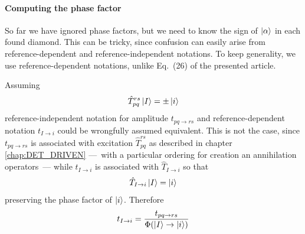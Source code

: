 \documentclass[./thesis.tex]{subfiles}
\begin{document}
\paragraph{Computing the phase factor}



So far we have ignored phase factors, but we need to know the sign of ${\ket{\alpha}}$ in each found diamond. This can be tricky, since confusion can easily arise from reference-dependent and reference-independent notations. To keep generality, we use reference-dependent notations, unlike Eq.~(26) of the presented article.

Assuming
\begin{equation}
\hat T_{pq}^{rs} \ket I = \pm \ket i
\end{equation}
reference-independent notation for amplitude $t_{pq \rightarrow rs}$ and reference-dependent notation $t_{I \rightarrow i}$ could be wrongfully assumed equivalent. This is not the case, since $t_{pq \rightarrow rs}$ is associated with excitation $\hat T_{pq}^{rs}$ as described in chapter \ref{chap:DET_DRIVEN} ---~with a particular ordering for creation an annihilation operators~--- while $t_{I \rightarrow i}$ is associated with $\hat T_{I \rightarrow i}$ so that
\begin{equation}
\hat T_{I \rightarrow i}  \ket I = \ket i
\end{equation}
preserving the phase factor of $\ket i$. Therefore
\begin{equation}
t_{I \rightarrow i} = \frac{t_{pq \rightarrow rs}}{{\Phi \qty(\ket I \rightarrow \ket i)}}
\end{equation}
\end{document}
